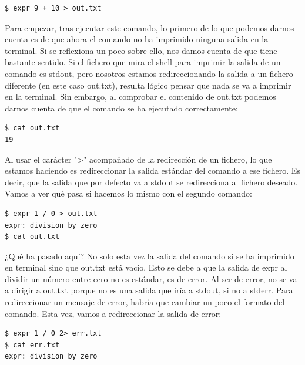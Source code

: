 \begin{tcolorbox-code}
\begin{lstlisting}
$ expr 9 + 10 > out.txt
\end{lstlisting}
\end{tcolorbox-code}

Para empezar, tras ejecutar este comando, lo primero de lo que  podemos darnos cuenta es de que ahora el comando no ha imprimido ninguna salida en la terminal. Si se reflexiona un poco sobre ello, nos damos cuenta de que tiene bastante sentido. Si el fichero que mira el shell para imprimir la salida de un comando es stdout, pero nosotros estamos redireccionando la salida a un fichero diferente (en este caso out.txt), resulta lógico pensar que nada se va a imprimir en la terminal. Sin embargo, al comprobar el contenido de out.txt podemos darnos cuenta de que el comando se ha ejecutado correctamente:

\begin{tcolorbox-code}
\begin{lstlisting}
$ cat out.txt
19
\end{lstlisting}
\end{tcolorbox-code}

Al usar el carácter ">" acompañado de la redirección de un fichero, lo que estamos haciendo es redireccionar la salida estándar del comando a ese fichero. Es decir, que la salida que por defecto va a stdout se redirecciona al fichero deseado. Vamos a ver qué pasa si hacemos lo mismo con el segundo comando:

\begin{tcolorbox-code}
\begin{lstlisting}
$ expr 1 / 0 > out.txt
expr: division by zero
$ cat out.txt
\end{lstlisting}
\end{tcolorbox-code}

¿Qué ha pasado aquí? No solo esta vez la salida del comando sí se ha imprimido en terminal sino que out.txt está vacío. Esto se debe a que la salida de expr al dividir un número entre cero no es estándar, es de error. Al ser de error, no se va a dirigir a out.txt porque no es una salida que iría a stdout, si no a stderr. Para redireccionar un mensaje de error, habría que cambiar un poco el formato del comando. Esta vez, vamos a redireccionar la salida de error:

\begin{tcolorbox-code}
\begin{lstlisting}
$ expr 1 / 0 2> err.txt
$ cat err.txt
expr: division by zero
\end{lstlisting}
\end{tcolorbox-code}

